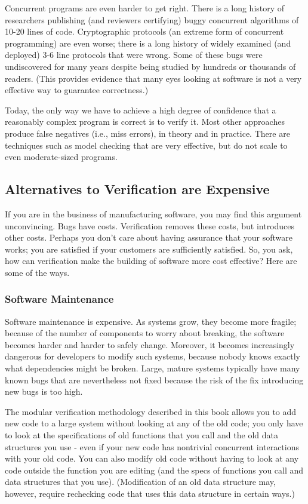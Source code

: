 \documentclass{report}
\newcommand{\Todo}[1]{\marginpar{#1}}
\begin{document}
Concurrent programs are even harder to get right. There is a long
history of researchers publishing (and reviewers certifying) buggy
concurrent algorithms of 10-20 lines of code. Cryptographic protocols
(an extreme form of concurrent programming) are even worse; there is a
long history of widely examined (and deployed) 3-6 line protocols that
were wrong. Some of these bugs were undiscovered for many years
despite being studied by hundreds or thousands of readers. (This
provides evidence that many eyes looking at software is not a very
effective way to guarantee correctness.)

Today, the only way we have to achieve a high degree of confidence
that a reasonably complex program is correct is to verify it.  Most
other approaches produce false negatives (i.e., miss errors),
in theory and in practice. There are techniques such as model checking
that are very effective, but do not scale to even moderate-sized
programs. \Todo{review of other techniques somewhere}

\subsection{Alternatives to Verification are Expensive}
If you are in the business of manufacturing software, you may find
this argument unconvincing. Bugs have costs. Verification removes
these costs, but introduces other costs. Perhaps you don't care about
having assurance that your software works; you are satisfied if your
customers are sufficiently satisfied. So, you ask, how can
verification make the building of software more cost effective?  Here
are some of the ways.


\subsubsection{Software Maintenance}
Software maintenance is expensive.  As systems grow, they become more
fragile; because of the number of components to worry about breaking,
the software becomes harder and harder to safely change. Moreover, it
becomes increasingly dangerous for developers to modify such systems,
because nobody knows exactly what dependencies might be broken. Large,
mature systems typically have many known bugs that are nevertheless
not fixed because the risk of the fix introducing new bugs is too
high.

The modular verification methodology described in this book allows you
to add new code to a large system without looking at any of the old
code; you only have to look at the specifications of old functions
that you call and the old data structures you use - even if your new
code has nontrivial concurrent interactions with your old code. You
can also modify old code without having to look at any code outside
the function you are editing (and the specs of functions you call and
data structures that you use). (Modification of an old data structure
may, however, require rechecking code that uses this data structure in
certain ways.)
\end{document}
